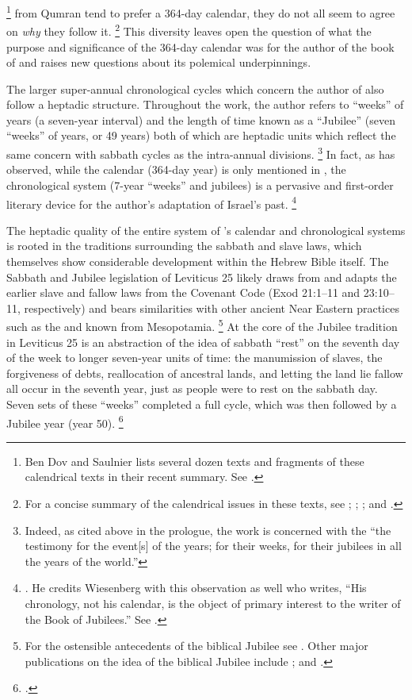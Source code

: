     \footnote{Ben Dov and Saulnier lists several dozen texts and fragments of these calendrical texts in their recent summary. See \cite[132--133]{bendov-saulnier_cbr2008}.}
from Qumran tend to prefer a 364-day calendar, they do not all seem to agree on \emph{why} they follow it.%
    \footnote{For a concise summary of the calendrical issues in these texts, see 
        \cite{vanderkam1998};
        \cite[233--268]{glessmer_flint-vanderkam1999};
        \cite[127--135]{bendov-saulnier_cbr2008}; and 
        \cite{jacobus_brooke-hempel2018}.}
This diversity leaves open the question of what the purpose and significance of the 364-day calendar was for the author of the book of \jub and raises new questions about its polemical underpinnings.

The larger super-annual chronological cycles which concern the author of \jub also follow a heptadic structure. Throughout the work, the author refers to ``weeks'' of years (a seven-year interval) and the length of time known as a ``Jubilee'' (seven ``weeks'' of years, or 49 years) both of which are heptadic units which reflect the same concern with sabbath cycles as the intra-annual divisions.%
    \footnote{Indeed, as cited above in the prologue, the work is concerned with the ``the testimony for the event[s] of the years; for their weeks, for their jubilees in all the years of the world.''}
In fact, as \vanderkam has observed, while the calendar (364-day year) is only mentioned in , the chronological system (7-year ``weeks'' and jubilees) is a pervasive and first-order literary device for the author's adaptation of Israel's past.%
    \footnote{\cite[522]{vanderkam-b_vanderkam2000}. He credits Wiesenberg with this observation as well who writes, ``His chronology, not his calendar, is the object of primary interest to the writer of the Book of Jubilees.'' See \cite[4]{wiesenberg_rev-qumran1961}.}

The heptadic quality of the entire system of \jub's calendar and chronological systems is rooted in the traditions surrounding the sabbath and slave laws, which themselves show considerable development within the Hebrew Bible itself. The Sabbath and Jubilee legislation of Leviticus 25 likely draws from and adapts the earlier slave and fallow laws from the Covenant Code (Exod 21:1--11 and 23:10--11, respectively) and bears similarities with other ancient Near Eastern practices such as the  and  known from Mesopotamia.%
    \footnote{For the ostensible antecedents of the biblical Jubilee see \cite[1--51]{bergsma2007}. Other major publications on the idea of the biblical Jubilee include 
        \cite{north1954};
        \cite{fager1993} and 
        \cite{lefebvre2003}.}
At the core of the Jubilee tradition in Leviticus 25 is an abstraction of the idea of sabbath ``rest'' on the seventh day of the week to longer seven-year units of time: the manumission of slaves, the forgiveness of debts, reallocation of ancestral lands, and letting the land lie fallow all occur in the seventh year, just as people were to rest on the sabbath day. Seven sets of these ``weeks'' completed a full cycle, which was then followed by a Jubilee year (year 50).%
    \footnote{\cite[85--92]{bergsma2007}.}

